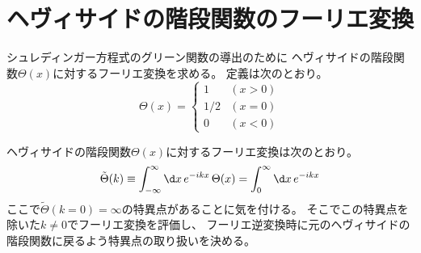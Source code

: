 \section{ヘヴィサイドの階段関数のフーリエ変換}

\label{sec:step_fourier}

シュレディンガー方程式のグリーン関数の導出のために
ヘヴィサイドの階段関数$\Theta(x)$に対するフーリエ変換を求める。
定義は次のとおり。
\begin{equation}
  \Theta(x)=
  \begin{cases}
    1   & (x>0) \\
    1/2 & (x=0) \\
    0   & (x<0)
  \end{cases}
\end{equation}

ヘヴィサイドの階段関数$\Theta(x)$に対するフーリエ変換は次のとおり。
\begin{equation}
  \label{eq:step_fourier_integral}
  \tilde{\Theta}(k)
  \equiv \int_{-\infty}^\infty\d x\,e^{-ikx}\,\Theta(x)
  =\int_0^\infty\d x\,e^{-ikx}
\end{equation}
ここで$\tilde{\Theta}(k=0)=\infty$の特異点があることに気を付ける。
そこでこの特異点を除いた$k\neq0$でフーリエ変換を評価し、
フーリエ逆変換時に元のヘヴィサイドの階段関数に戻るよう特異点の取り扱いを決める。

